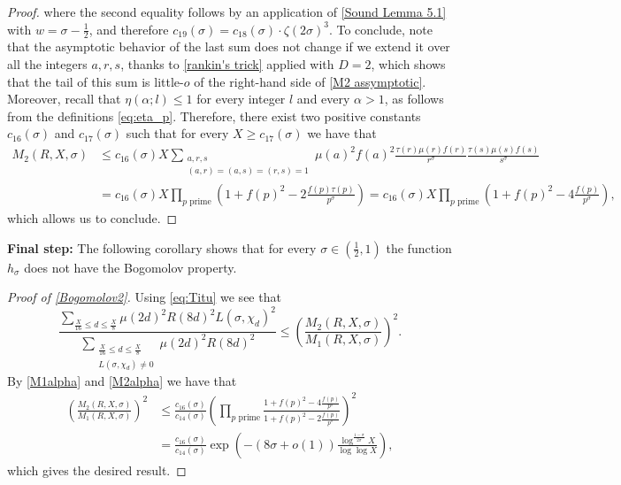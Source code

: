 \documentclass[10pt,a4paper]{amsart}
\theoremstyle{plain}
\theoremstyle{definition}
\theoremstyle{remark}
\begin{document}
\begin{proof}
where the second equality follows by an application of \eqref{Sound Lemma 5.1} with $w = \sigma - \frac{1}{2}$, and therefore $c_{19}(\sigma) = c_{18}(\sigma) \cdot \zeta(2 \sigma)^3$.
To conclude, note that the asymptotic behavior of the last sum does not change if we extend it over all the integers $a,r,s$, thanks to \cref{rankin's trick} applied with $D=2$, which shows that the tail of this sum is little-$o$ of the right-hand side of \eqref{M2 assymptotic}. 
Moreover, recall that $\eta(\alpha;l) \leq 1$ for every integer $l$ and every $\alpha > 1$, as follows from the definitions \eqref{eq:eta_p}.
Therefore, there exist two positive constants $c_{16}(\sigma)$ and $c_{17}(\sigma)$ such that for every $X \geq c_{17}(\sigma)$ we have that
\begin{align*}
    M_2(R,X,\sigma) &\leq c_{16}(\sigma) X \sum_{\substack{a,r,s \\(a,r)=(a,s)=(r,s)=1}}
\mu(a)^2f(a)^2\frac{\tau(r)\mu(r)f(r)}{r^\sigma}\frac{\tau(s)\mu(s)f(s)}{s^\sigma} \\
&= c_{16}(\sigma) X\prod_{p\text{ prime}}\left(1+f(p)^2- 2\frac{f(p)\tau(p)}{p^{\sigma}}\right) = c_{16}(\sigma) X\prod_{p\text{ prime}}\left(1+f(p)^2- 4\frac{f(p)}{p^{\sigma}}\right),
\end{align*}
which allows us to conclude.
\end{proof}

\textbf{Final step:} The following corollary shows that for every $\sigma \in \left(\frac{1}{2},1\right)$ the function $h_{\sigma}$ does not have the Bogomolov property.

\begin{proof}[Proof of \cref{Bogomolov2}]
Using \eqref{eq:Titu} we see that
\begin{equation*}
\frac{\displaystyle{\sum_{\frac{X}{16}\leq d\leq \frac{X}{8}}\mu(2d)^2R(8d)^2 L(\sigma,\chi_d) ^2}}{\displaystyle{\sum_{\substack{\frac{X}{16}\leq d\leq \frac{X}{8}\\ L(\sigma,\chi_d)\neq 0 }}\mu(2d)^2R(8d)^2}}\leq \left(\frac{M_2(R,X,\sigma)}{M_1(R,X,\sigma)}\right)^2.  
\end{equation*}
By \cref{M1alpha} and \cref{M2alpha} we have that 
\begin{align*}
\left(\frac{M_2(R,X,\sigma)}{M_1(R,X,\sigma)}\right)^2 &\le
\frac{c_{16}(\sigma)}{c_{14}(\sigma)}\left(\prod_{p\text{ prime}}\frac{1+f(p)^2-4\frac{f(p)}{p^{\sigma}}}{1+f(p)^2-2\frac{f(p)}{p^{\sigma}}}\right)^2
\\
&=\frac{c_{16}(\sigma)}{c_{14}(\sigma)} \exp\left(-
\left(
8\sigma+o(1)\right)\frac{\log^{\frac{1-\sigma}{2\sigma}} X}{\log\log X}\right),
\end{align*}
which gives the desired result.
\end{proof}
\end{document}
